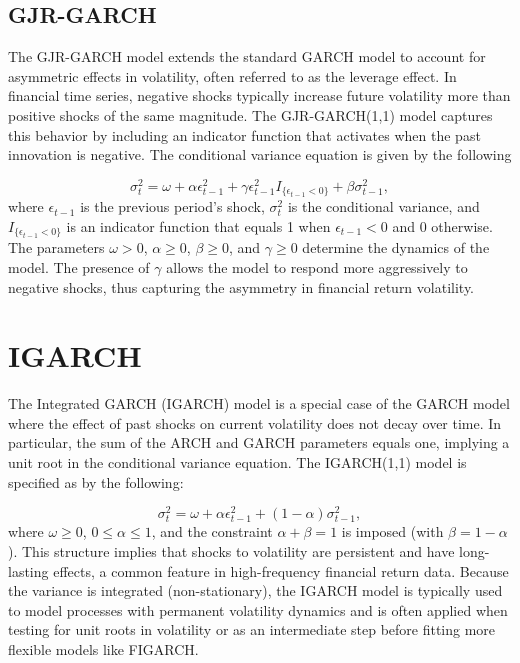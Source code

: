\subsection{GJR-GARCH}

The GJR-GARCH model extends the standard GARCH model to account for asymmetric effects in volatility, often referred to as the leverage effect. In financial time series, negative shocks typically increase future volatility more than positive shocks of the same magnitude. The GJR-GARCH(1,1) model captures this behavior by including an indicator function that activates when the past innovation is negative. The conditional variance equation is given by the following

\begin{equation}
	\sigma_t^2 = \omega + \alpha \epsilon_{t-1}^2 + \gamma \epsilon_{t-1}^2 I_{\{\epsilon_{t-1} < 0\}} + \beta \sigma_{t-1}^2,
\end{equation}
where $\epsilon_{t-1}$ is the previous period's shock, $\sigma_t^2$ is the conditional variance, and $I_{\{\epsilon_{t-1} < 0\}}$ is an indicator function that equals 1 when $\epsilon_{t-1} < 0$ and 0 otherwise. The parameters $\omega > 0$, $\alpha \geq 0$, $\beta \geq 0$, and $\gamma \geq 0$ determine the dynamics of the model. The presence of $\gamma$ allows the model to respond more aggressively to negative shocks, thus capturing the asymmetry in financial return volatility.

\section{IGARCH}

The Integrated GARCH (IGARCH) model is a special case of the GARCH model where the effect of past shocks on current volatility does not decay over time. In particular, the sum of the ARCH and GARCH parameters equals one, implying a unit root in the conditional variance equation. The IGARCH(1,1) model is specified as by the following:

\begin{equation}
	\sigma_t^2 = \omega + \alpha \epsilon_{t-1}^2 + (1 - \alpha) \sigma_{t-1}^2,
\end{equation}
where $\omega \geq 0$, $0 \leq \alpha \leq 1$, and the constraint $\alpha + \beta = 1$ is imposed (with $\beta = 1 - \alpha$). This structure implies that shocks to volatility are persistent and have long-lasting effects, a common feature in high-frequency financial return data. Because the variance is integrated (non-stationary), the IGARCH model is typically used to model processes with permanent volatility dynamics and is often applied when testing for unit roots in volatility or as an intermediate step before fitting more flexible models like FIGARCH.

